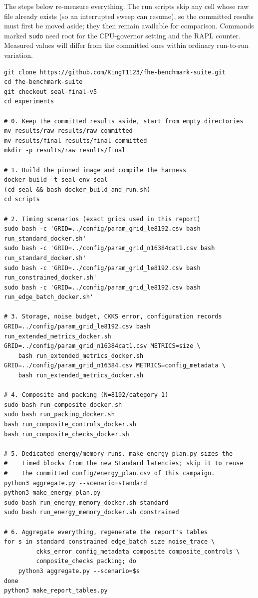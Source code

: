 The steps below re-measure everything. The run scripts skip any cell whose raw file already exists (so an interrupted sweep can resume), so the committed results must first be moved aside; they then remain available for comparison. Commands marked \texttt{sudo} need root for the CPU-governor setting and the RAPL counter. Measured values will differ from the committed ones within ordinary run-to-run variation.

\begin{lstlisting}
git clone https://github.com/KingT1123/fhe-benchmark-suite.git
cd fhe-benchmark-suite
git checkout seal-final-v5
cd experiments

# 0. Keep the committed results aside, start from empty directories
mv results/raw results/raw_committed
mv results/final results/final_committed
mkdir -p results/raw results/final

# 1. Build the pinned image and compile the harness
docker build -t seal-env seal
(cd seal && bash docker_build_and_run.sh)
cd scripts

# 2. Timing scenarios (exact grids used in this report)
sudo bash -c 'GRID=../config/param_grid_le8192.csv bash run_standard_docker.sh'
sudo bash -c 'GRID=../config/param_grid_n16384cat1.csv bash run_standard_docker.sh'
sudo bash -c 'GRID=../config/param_grid_le8192.csv bash run_constrained_docker.sh'
sudo bash -c 'GRID=../config/param_grid_le8192.csv bash run_edge_batch_docker.sh'

# 3. Storage, noise budget, CKKS error, configuration records
GRID=../config/param_grid_le8192.csv bash run_extended_metrics_docker.sh
GRID=../config/param_grid_n16384cat1.csv METRICS=size \
    bash run_extended_metrics_docker.sh
GRID=../config/param_grid_n16384.csv METRICS=config_metadata \
    bash run_extended_metrics_docker.sh

# 4. Composite and packing (N=8192/category 1)
sudo bash run_composite_docker.sh
sudo bash run_packing_docker.sh
bash run_composite_controls_docker.sh
bash run_composite_checks_docker.sh

# 5. Dedicated energy/memory runs. make_energy_plan.py sizes the
#    timed blocks from the new Standard latencies; skip it to reuse
#    the committed config/energy_plan.csv of this campaign.
python3 aggregate.py --scenario=standard
python3 make_energy_plan.py
sudo bash run_energy_memory_docker.sh standard
sudo bash run_energy_memory_docker.sh constrained

# 6. Aggregate everything, regenerate the report's tables
for s in standard constrained edge_batch size noise_trace \
         ckks_error config_metadata composite composite_controls \
         composite_checks packing; do
    python3 aggregate.py --scenario=$s
done
python3 make_report_tables.py
\end{lstlisting}

